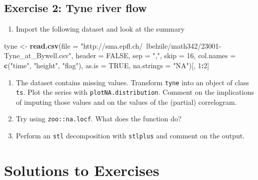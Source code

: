 \documentclass[]{book}
\newenvironment{Shaded}{\begin{snugshade}}{\end{snugshade}}
\newcommand{\DataTypeTok}[1]{\textcolor[rgb]{0.13,0.29,0.53}{#1}}
\newcommand{\DecValTok}[1]{\textcolor[rgb]{0.00,0.00,0.81}{#1}}
\newcommand{\KeywordTok}[1]{\textcolor[rgb]{0.13,0.29,0.53}{\textbf{#1}}}
\newcommand{\NormalTok}[1]{#1}
\newcommand{\OperatorTok}[1]{\textcolor[rgb]{0.81,0.36,0.00}{\textbf{#1}}}
\newcommand{\OtherTok}[1]{\textcolor[rgb]{0.56,0.35,0.01}{#1}}
\newcommand{\StringTok}[1]{\textcolor[rgb]{0.31,0.60,0.02}{#1}}
\providecommand{\tightlist}{%
  \setlength{\itemsep}{0pt}\setlength{\parskip}{0pt}}
\begin{document}
\hypertarget{exercise-2-tyne-river-flow}{%
\subsection{Exercise 2: Tyne river flow}\label{exercise-2-tyne-river-flow}}

\begin{enumerate}
\def\labelenumi{\arabic{enumi}.}
\tightlist
\item
  Import the following dataset and look at the summary
\end{enumerate}

\begin{Shaded}
\begin{Highlighting}[]
\NormalTok{tyne <-}\StringTok{ }\KeywordTok{read.csv}\NormalTok{(}\DataTypeTok{file =} \StringTok{"http://sma.epfl.ch/~lbelzile/math342/23001-Tyne_at_Bywell.csv"}\NormalTok{, }
    \DataTypeTok{header =} \OtherTok{FALSE}\NormalTok{, }\DataTypeTok{sep =} \StringTok{","}\NormalTok{, }\DataTypeTok{skip =} \DecValTok{16}\NormalTok{, }\DataTypeTok{col.names =} \KeywordTok{c}\NormalTok{(}\StringTok{"time"}\NormalTok{, }\StringTok{"height"}\NormalTok{, }\StringTok{"flag"}\NormalTok{), }
    \DataTypeTok{as.is =} \OtherTok{TRUE}\NormalTok{, }\DataTypeTok{na.strings =} \StringTok{"NA"}\NormalTok{)[, }\DecValTok{1}\OperatorTok{:}\DecValTok{2}\NormalTok{]}
\end{Highlighting}
\end{Shaded}

\begin{enumerate}
\def\labelenumi{\arabic{enumi}.}
\setcounter{enumi}{1}
\tightlist
\item
  The dataset contains missing values. Transform \texttt{tyne} into an object of class \texttt{ts}. Plot the series with \texttt{plotNA.distribution}. Comment on the implications of imputing those values and on the values of the (partial) correlogram.
\item
  Try using \texttt{zoo::na.locf}. What does the function do?
\item
  Perform an \texttt{stl} decomposition with \texttt{stlplus} and comment on the output.
\end{enumerate}

\hypertarget{solutions-to-exercises-3}{%
\section{Solutions to Exercises}\label{solutions-to-exercises-3}}
\end{document}
